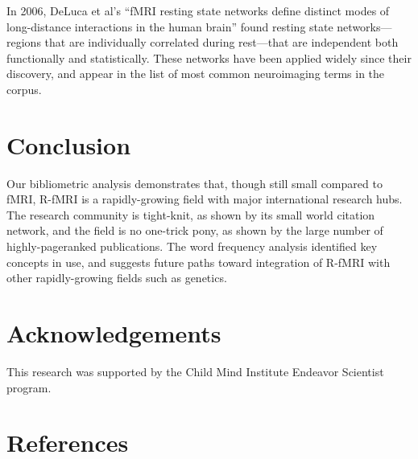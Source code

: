 \documentclass[5p]{elsarticle}
\begin{document}
In 2006, DeLuca et al’s ``fMRI resting state networks define distinct
modes of long-distance interactions in the human brain'' found resting
state networks—regions that are individually correlated during rest—that
are independent both functionally and statistically. These networks have
been applied widely since their discovery, and appear in the list of most
common neuroimaging terms in the corpus.

\section{Conclusion}

Our bibliometric analysis demonstrates that, though still small compared
to fMRI, R-fMRI is a rapidly-growing field with major international
research hubs.  The research community is tight-knit, as shown by its
small world citation network, and the field is no one-trick pony, as shown
by the large number of highly-pageranked publications. The word frequency
analysis identified key concepts in use, and suggests future paths toward
integration of R-fMRI with other rapidly-growing fields such as genetics.

\section{Acknowledgements} This research was supported by the Child Mind
Institute Endeavor Scientist program.

{
\section*{References}

 
}
\end{document}
